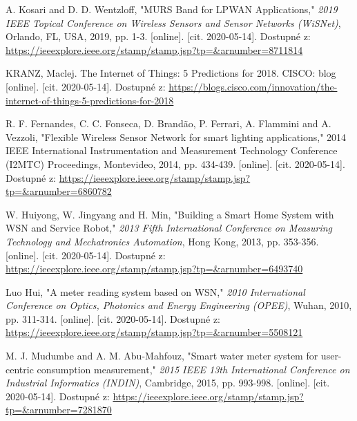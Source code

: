 \begin{thebibliography}{9}
A. Kosari and D. D. Wentzloff, "MURS Band for LPWAN Applications," \textit{2019 IEEE Topical Conference on Wireless Sensors and Sensor Networks (WiSNet)}, Orlando, FL, USA, 2019, pp. 1-3.
[online]. [cit. 2020-05-14]. Dostupné z: 
\url{
https://ieeexplore.ieee.org/stamp/stamp.jsp?tp=&arnumber=8711814
}
 


KRANZ, Maclej. The Internet of Things: 5 Predictions for 2018. CISCO: blog 
[online]. [cit. 2020-05-14]. Dostupné z: 
\url{
https://blogs.cisco.com/innovation/the-internet-of-things-5-predictions-for-2018
}
 

R. F. Fernandes, C. C. Fonseca, D. Brandão, P. Ferrari, A. Flammini and A. Vezzoli, "Flexible Wireless Sensor Network for smart lighting applications," 2014 IEEE International Instrumentation and Measurement Technology Conference (I2MTC) Proceedings, Montevideo, 2014, pp. 434-439.
[online]. [cit. 2020-05-14]. Dostupné z: 
\url{
https://ieeexplore.ieee.org/stamp/stamp.jsp?tp=&arnumber=6860782
}
 



W. Huiyong, W. Jingyang and H. Min, "Building a Smart Home System with WSN and Service Robot," \textit{2013 Fifth International Conference on Measuring Technology and Mechatronics Automation}, Hong Kong, 2013, pp. 353-356.
[online]. [cit. 2020-05-14]. Dostupné z: 
\url{
https://ieeexplore.ieee.org/stamp/stamp.jsp?tp=&arnumber=6493740
}
 


Luo Hui, "A meter reading system based on WSN," \textit{2010 International Conference on Optics, Photonics and Energy Engineering (OPEE)}, Wuhan, 2010, pp. 311-314.
[online]. [cit. 2020-05-14]. Dostupné z: 
\url{
https://ieeexplore.ieee.org/stamp/stamp.jsp?tp=&arnumber=5508121
}
 


M. J. Mudumbe and A. M. Abu-Mahfouz, "Smart water meter system for user-centric consumption measurement," \textit{2015 IEEE 13th International Conference on Industrial Informatics (INDIN)}, Cambridge, 2015, pp. 993-998.
[online]. [cit. 2020-05-14]. Dostupné z: 
\url{
https://ieeexplore.ieee.org/stamp/stamp.jsp?tp=&arnumber=7281870
}
 



\end{thebibliography}
